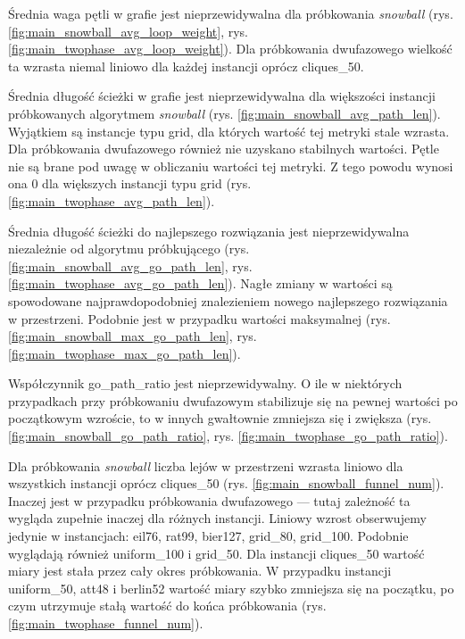 Średnia waga pętli w grafie jest nieprzewidywalna dla próbkowania \textit{snowball} (rys. \ref{fig:main_snowball_avg_loop_weight}, rys. \ref{fig:main_twophase_avg_loop_weight}).
Dla próbkowania dwufazowego wielkość ta wzrasta niemal liniowo dla każdej instancji oprócz cliques\_50.

Średnia długość ścieżki w grafie jest nieprzewidywalna dla większości instancji próbkowanych algorytmem \textit{snowball} (rys. \ref{fig:main_snowball_avg_path_len}).
Wyjątkiem są instancje typu grid, dla których wartość tej metryki stale wzrasta.
Dla próbkowania dwufazowego również nie uzyskano stabilnych wartości.
Pętle nie są brane pod uwagę w obliczaniu wartości tej metryki. Z tego powodu wynosi ona 0 dla większych instancji typu grid (rys. \ref{fig:main_twophase_avg_path_len}).

Średnia długość ścieżki do najlepszego rozwiązania jest nieprzewidywalna niezależnie od algorytmu próbkującego (rys. \ref{fig:main_snowball_avg_go_path_len}, rys. \ref{fig:main_twophase_avg_go_path_len}).
Nagłe zmiany w wartości są spowodowane najprawdopodobniej znalezieniem nowego najlepszego rozwiązania w przestrzeni.
Podobnie jest w przypadku wartości maksymalnej (rys. \ref{fig:main_snowball_max_go_path_len}, rys. \ref{fig:main_twophase_max_go_path_len}).

Współczynnik go\_path\_ratio jest nieprzewidywalny. O ile w niektórych przypadkach przy próbkowaniu dwufazowym stabilizuje się na pewnej wartości
po początkowym wzroście, to w innych gwałtownie zmniejsza się i zwiększa (rys. \ref{fig:main_snowball_go_path_ratio}, rys. \ref{fig:main_twophase_go_path_ratio}).

Dla próbkowania \textit{snowball} liczba lejów w przestrzeni wzrasta liniowo dla wszystkich instancji oprócz cliques\_50 (rys. \ref{fig:main_snowball_funnel_num}).
Inaczej jest w przypadku próbkowania dwufazowego --- tutaj zależność ta wygląda zupełnie inaczej dla różnych instancji.
Liniowy wzrost obserwujemy jedynie w instancjach: eil76, rat99, bier127, grid\_80, grid\_100. Podobnie wyglądają również uniform\_100 i grid\_50.
Dla instancji cliques\_50 wartość miary jest stała przez cały okres próbkowania. W przypadku instancji uniform\_50, att48 i berlin52 wartość miary
szybko zmniejsza się na początku, po czym utrzymuje stałą wartość do końca próbkowania (rys. \ref{fig:main_twophase_funnel_num}).

